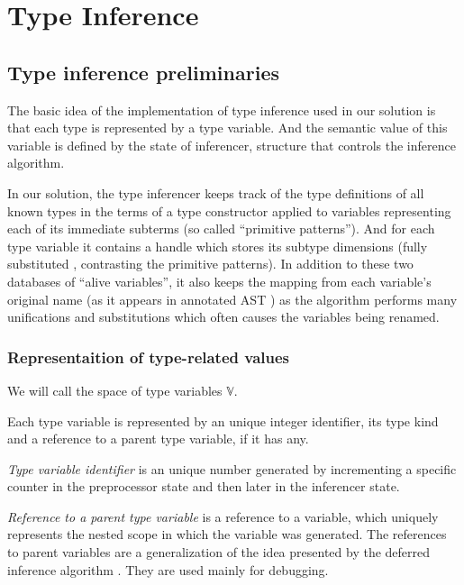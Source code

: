 \section{Type Inference}

\subsection{Type inference preliminaries}

The basic idea of the implementation of type inference used in our solution is that each type is represented by a type variable. And the semantic value of this variable is defined by the state of inferencer, structure that controls the inference algorithm.

In our solution, the type inferencer keeps track of the type definitions of all known types in the terms of a type constructor applied to variables representing each of its immediate subterms (so called ``primitive patterns''). And for each type variable it contains a handle which stores its subtype dimensions (fully substituted , contrasting the primitive patterns). In addition to these two databases of ``alive variables'', it also keeps the mapping from each variable's original name (as it appears in annotated AST ) as the algorithm performs many unifications and substitutions which often causes the variables being renamed.

\subsubsection{Representaition of type-related values}

\begin{defn}
    We will call the space of type variables $\mathbb{V}$.

    Each type variable is represented by an unique integer identifier, its type kind and a reference to a parent type variable, if it has any.

    \emph{Type variable identifier} is an unique number generated by incrementing a specific counter in the preprocessor state  and then later in the inferencer state.

    \emph{Reference to a parent type variable} is a reference to a variable, which uniquely represents the nested scope in which the variable was generated. The references to parent variables are a generalization of the idea presented by the deferred inference algorithm  . They are used mainly for debugging.
\end{defn}

